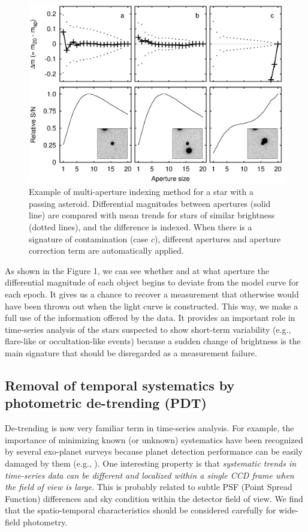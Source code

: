 \documentclass[11pt,twoside]{article}
\begin{document}
\begin{figure}[!ht]
\begin{center}
\includegraphics[scale=0.45]{O07_f1.eps}
\caption{Example of multi-aperture indexing method for a star with a passing asteroid.  Differential magnitudes between apertures (solid line) are compared with mean trends for stars of similar brightness (dotted lines), and the difference is indexed.  When there is a signature of contamination (case $c$), different apertures and aperture correction term are automatically applied.}
\end{center}
\label{Fig1}
\end{figure}

\noindent As shown in the Figure 1, we can see whether and at what aperture the differential magnitude of each object begins to deviate from the model curve for each epoch.  It gives us a chance to recover a measurement that otherwise would have been thrown out when the light curve is constructed.  This way, we make a full use of the information offered by the data.  It provides an important role in time-series analysis of the stars suspected to show short-term variability (e.g., flare-like or occultation-like events) because a sudden change of brightness is the main signature that should be disregarded as a measurement failure.  

\subsection{Removal of temporal systematics by photometric de-trending (PDT)}
De-trending is now very familiar term in time-series analysis.  For example, the importance of minimizing known (or unknown) systematics have been recognized by several exo-planet surveys because planet detection performance can be easily damaged by them (e.g., \citealt{kov05, tam05, pon06}).  One interesting property is that {\itshape systematic trends in time-series data can be different and localized within a single CCD frame when the field of view is large}.  This is probably related to subtle PSF (Point Spread Function) differences and sky condition within the detector field of view.  We find that the spatio-temporal characteristics should be considered carefully for wide-field photometry.
\end{document}
